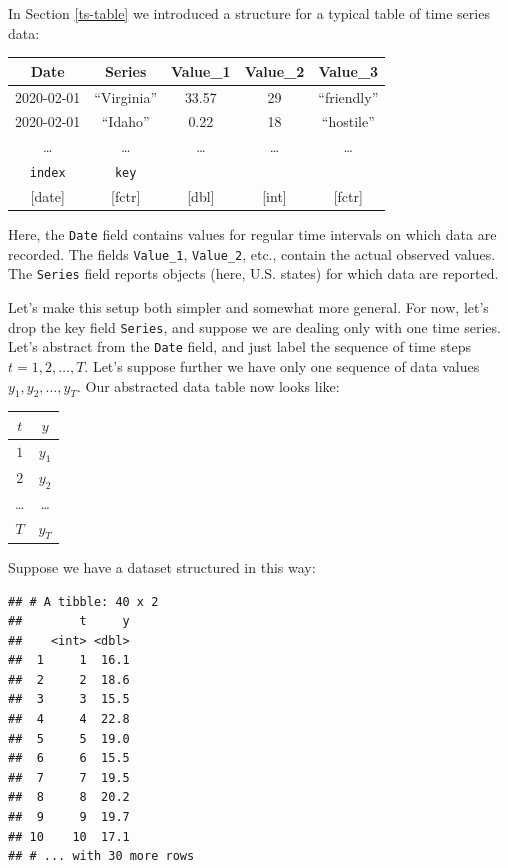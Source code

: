 \documentclass[
]{book}
\begin{document}
In Section \ref{ts-table} we introduced a structure for a typical table of time series data:

\begin{longtable}[]{@{}ccccc@{}}
\toprule
Date & Series & Value\_1 & Value\_2 & Value\_3 \\
\midrule
\endhead
2020-02-01 & ``Virginia'' & 33.57 & 29 & ``friendly'' \\
2020-02-01 & ``Idaho'' & 0.22 & 18 & ``hostile'' \\
\ldots{} & \ldots{} & \ldots{} & \ldots{} & \ldots{} \\
\texttt{index} & \texttt{key} & & & \\
{[}date{]} & {[}fctr{]} & {[}dbl{]} & {[}int{]} & {[}fctr{]} \\
\bottomrule
\end{longtable}

Here, the \texttt{Date} field contains values for regular time intervals on which data are recorded. The fields \texttt{Value\_1}, \texttt{Value\_2}, etc., contain the actual observed values. The \texttt{Series} field reports objects (here, U.S. states) for which data are reported.

Let's make this setup both simpler and somewhat more general. For now, let's drop the key field \texttt{Series}, and suppose we are dealing only with one time series. Let's abstract from the \texttt{Date} field, and just label the sequence of time steps \(t = 1,2,\ldots,T\). Let's suppose further we have only one sequence of data values \(y_1, y_2, \ldots, y_T\). Our abstracted data table now looks like:

\begin{longtable}[]{@{}cc@{}}
\toprule
\(t\) & \(y\) \\
\midrule
\endhead
\(1\) & \(y_1\) \\
\(2\) & \(y_2\) \\
\ldots{} & \ldots{} \\
\(T\) & \(y_T\) \\
\bottomrule
\end{longtable}

Suppose we have a dataset structured in this way:

\begin{verbatim}
## # A tibble: 40 x 2
##        t     y
##    <int> <dbl>
##  1     1  16.1
##  2     2  18.6
##  3     3  15.5
##  4     4  22.8
##  5     5  19.0
##  6     6  15.5
##  7     7  19.5
##  8     8  20.2
##  9     9  19.7
## 10    10  17.1
## # ... with 30 more rows
\end{verbatim}
\end{document}
